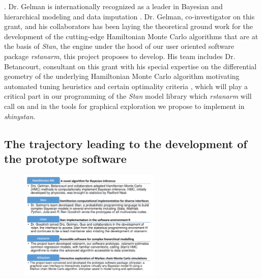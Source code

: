 \documentclass[11pt,notitlepage]{article}
\begin{document}
\cite{Gong2005, Gong2010, Gajic2011, Yu_24970344, Kor2014}. 
Dr. Gelman is internationally recognized as a leader in Bayesian and hierarchical 
modeling and data imputation 
\cite{Gelman1998notasked, Gelman2001imputation, Hoffman2014, Gelman-Hill_2014}. 
Dr. Gelman, co-investigator on this grant, and his collaborators has been laying the 
theoretical ground work for the development of the cutting-edge Hamiltonian 
Monte Carlo algorithms \cite{Hoffman2014,Stan_Software_2014} 
that are at the basis of \textit{Stan}, the engine 
under the hood of our user oriented software package \textit{rstanarm}, 
this project proposes to develop. His team includes Dr. Betancourt, 
consultant on this grant with his special expertise on the differential 
geometry of the underlying Hamiltonian Monte Carlo algorithm
motivating automated tuning heuristics and certain optimality criteria 
\cite{BetancourtGeometry2016}, which will play a 
critical part in our programming of the \textit{Stan} model library 
which \textit{rstanarm} will call on and in the tools for graphical exploration
we propose to implement in \textit{shinystan}.

\subsection*{The trajectory leading to the development of the prototype software} 

\begin{figure} %
    \centering
\includegraphics[width=0.6\textwidth]{Figures/SoftwareTrajectory.pdf}
\end{figure}
\end{document}
